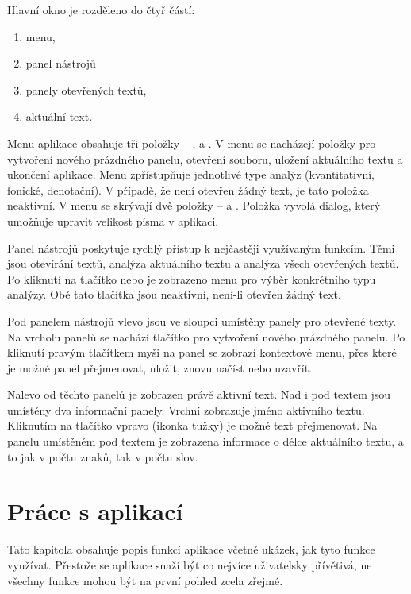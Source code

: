 \documentclass[dp.tex]{subfiles}
\begin{document}
Hlavní okno je rozděleno do čtyř částí:

\begin{enumerate}
	\item menu,
	\item panel nástrojů
	\item panely otevřených textů,
	\item aktuální text.
\end{enumerate}

Menu aplikace obsahuje tři položky -- ,  a . V menu  se nacházejí položky pro vytvoření nového prázdného panelu, otevření souboru, uložení aktuálního textu a ukončení aplikace. Menu  zpřístupňuje jednotlivé type analýz (kvantitativní, fonické, denotační). V případě, že není otevřen žádný text, je tato položka neaktivní. V menu  se skrývají dvě položky --  a . Položka  vyvolá dialog, který umožňuje upravit velikost písma v aplikaci.

Panel nástrojů poskytuje rychlý přístup k nejčastěji využívaným funkcím. Těmi jsou otevírání textů, analýza aktuálního textu a analýza všech otevřených textů. Po kliknutí na tlačítko  nebo  je zobrazeno menu pro výběr konkrétního typu analýzy. Obě tato tlačítka jsou neaktivní, není-li otevřen žádný text.

Pod panelem nástrojů vlevo jsou ve sloupci umístěny panely pro otevřené texty. Na vrcholu panelů se nachází tlačítko pro vytvoření nového prázdného panelu. Po kliknutí pravým tlačítkem myši na panel se zobrazí kontextové menu, přes které je možné panel přejmenovat,  uložit, znovu načíst nebo uzavřít.

Nalevo od těchto panelů je zobrazen právě aktivní text. Nad i pod textem jsou umístěny dva informační panely. Vrchní zobrazuje jméno aktivního textu. Kliknutím na tlačítko vpravo (ikonka tužky) je možné text přejmenovat. Na panelu umístěném pod textem je zobrazena informace o délce aktuálního textu, a to jak v počtu znaků, tak v počtu slov.

\section{Práce s aplikací}

Tato kapitola obsahuje popis funkcí aplikace včetně ukázek, jak tyto funkce využívat. Přestože se aplikace snaží být co nejvíce uživatelsky přívětivá, ne všechny funkce mohou být na první pohled zcela zřejmé.
\end{document}
